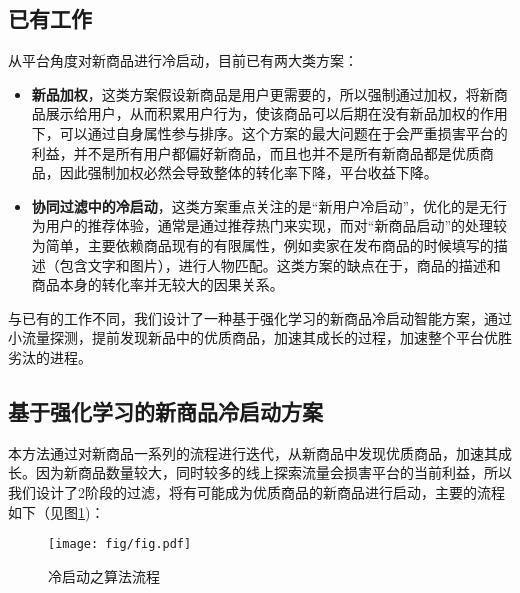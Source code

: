 \subsection{已有工作}
从平台角度对新商品进行冷启动，目前已有两大类方案：
\begin{itemize}  
\item \textbf{新品加权}，这类方案假设新商品是用户更需要的，所以强制通过加权，将新商品展示给用户，从而积累用户行为，使该商品可以后期在没有新品加权的作用下，可以通过自身属性参与排序。这个方案的最大问题在于会严重损害平台的利益，并不是所有用户都偏好新商品，而且也并不是所有新商品都是优质商品，因此强制加权必然会导致整体的转化率下降，平台收益下降。
\item \textbf{协同过滤中的冷启动}，这类方案重点关注的是“新用户冷启动”，优化的是无行为用户的推荐体验，通常是通过推荐热门来实现，而对“新商品启动”的处理较为简单，主要依赖商品现有的有限属性，例如卖家在发布商品的时候填写的描述（包含文字和图片），进行人物匹配。这类方案的缺点在于，商品的描述和商品本身的转化率并无较大的因果关系。
\end{itemize}

与已有的工作不同，我们设计了一种基于强化学习的新商品冷启动智能方案，通过小流量探测，提前发现新品中的优质商品，加速其成长的过程，加速整个平台优胜劣汰的进程。

\subsection{基于强化学习的新商品冷启动方案}

本方法通过对新商品一系列的流程进行迭代，从新商品中发现优质商品，加速其成长。因为新商品数量较大，同时较多的线上探索流量会损害平台的当前利益，所以我们设计了2阶段的过滤，将有可能成为优质商品的新商品进行启动，主要的流程如下（见图\ref{fig_problem})：
\begin{figure}[!h]
\centering
\texttt{[image: fig/fig.pdf]}
\caption{冷启动之算法流程}
\label{fig_problem}
\end{figure}

